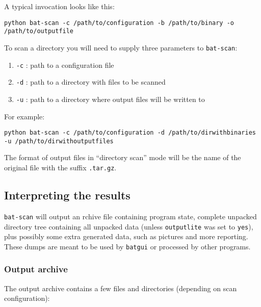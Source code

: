 \documentclass[10pt,a4paper]{article}
\begin{document}
A typical invocation looks like this:

\begin{verbatim}
python bat-scan -c /path/to/configuration -b /path/to/binary -o
/path/to/outputfile
\end{verbatim}

To scan a directory you will need to supply three parameters to
\texttt{bat-scan}:

\begin{enumerate}
\item \texttt{-c} : path to a configuration file
\item \texttt{-d} : path to a directory with files to be scanned
\item \texttt{-u} : path to a directory where output files will be written to
\end{enumerate}

For example:

\begin{verbatim}
python bat-scan -c /path/to/configuration -d /path/to/dirwithbinaries
-u /path/to/dirwithoutputfiles
\end{verbatim}

The format of output files in ``directory scan'' mode will be the name of the
original file with the suffix \texttt{.tar.gz}.

\subsection{Interpreting the results}

\texttt{bat-scan} will output an rchive file containing program state, complete
unpacked directory tree containing all unpacked data (unless \texttt{outputlite}
was set to \texttt{yes}), plus possibly some extra generated data, such as
pictures and more reporting. These dumps are meant to be used by
\texttt{batgui} or processed by other programs.

\subsubsection{Output archive}

The output archive contains a few files and directories (depending on scan
configuration):
\end{document}
